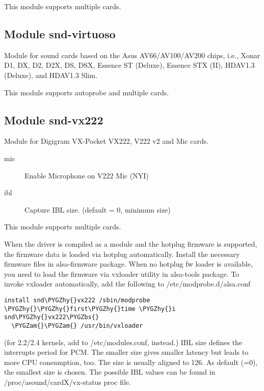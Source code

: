 \documentclass[a4paper,8pt,english]{sphinxmanual}
\def\PYGZbs{\char`\\}
\def\PYGZam{\char`\&}
\def\PYGZhy{\char`\-}
\begin{document}
This module supports multiple cards.


\subsection{Module snd-virtuoso}
\label{sound/alsa-configuration:module-snd-virtuoso}
Module for sound cards based on the Asus AV66/AV100/AV200 chips,
i.e., Xonar D1, DX, D2, D2X, DS, DSX, Essence ST (Deluxe),
Essence STX (II), HDAV1.3 (Deluxe), and HDAV1.3 Slim.

This module supports autoprobe and multiple cards.


\subsection{Module snd-vx222}
\label{sound/alsa-configuration:module-snd-vx222}
Module for Digigram VX-Pocket VX222, V222 v2 and Mic cards.
\begin{description}
\item[{mic}] \leavevmode
Enable Microphone on V222 Mic (NYI)

\item[{ibl}] \leavevmode
Capture IBL size. (default = 0, minimum size)

\end{description}

This module supports multiple cards.

When the driver is compiled as a module and the hotplug firmware
is supported, the firmware data is loaded via hotplug automatically.
Install the necessary firmware files in alsa-firmware package.
When no hotplug fw loader is available, you need to load the
firmware via vxloader utility in alsa-tools package.  To invoke
vxloader automatically, add the following to /etc/modprobe.d/alsa.conf

\begin{Verbatim}[commandchars=\\\{\}]
install snd\PYGZhy{}vx222 /sbin/modprobe \PYGZhy{}\PYGZhy{}first\PYGZhy{}time \PYGZhy{}i snd\PYGZhy{}vx222\PYGZbs{}
  \PYGZam{}\PYGZam{} /usr/bin/vxloader
\end{Verbatim}

(for 2.2/2.4 kernels, add  to
/etc/modules.conf, instead.)
IBL size defines the interrupts period for PCM.  The smaller size
gives smaller latency but leads to more CPU consumption, too.
The size is usually aligned to 126.  As default (=0), the smallest
size is chosen.  The possible IBL values can be found in
/proc/asound/cardX/vx-status proc file.
\end{document}
